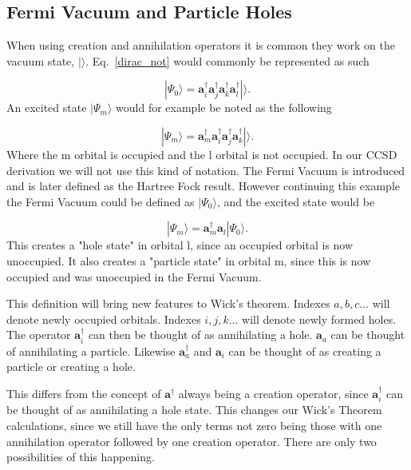 \documentclass[graybox,sectrefs,envcountresetchap,open=right]{svmonodo}
\begin{document}
\subsection{Fermi Vacuum and Particle Holes}

When using creation and annihilation operators it is common they work on the vacuum state, $| \rangle$. Eq.~\ref{dirac_not} would commonly be represented as such

\begin{equation}
|\Psi_0 \rangle = \mathbf{a}^{\dagger}_i
\mathbf{a}^{\dagger}_j
\mathbf{a}^{\dagger}_k
\mathbf{a}^{\dagger}_l |\rangle .
\end{equation} 
An excited state $|\Psi_m\rangle$ would for example be noted as the following

\begin{equation}
|\Psi_m \rangle = \mathbf{a}^{\dagger}_m
\mathbf{a}^{\dagger}_i
\mathbf{a}^{\dagger}_j
\mathbf{a}^{\dagger}_k |\rangle .
\end{equation} 
Where the m orbital is occupied and the l orbital is not occupied. In our CCSD derivation we will not use this kind of notation. The Fermi Vacuum is introduced and is later defined as the Hartree Fock result. However continuing this example the Fermi Vacuum could be defined as $|\Psi_0\rangle$, and the excited state would be

\begin{equation}
|\Psi_m\rangle = \mathbf{a}^{\dagger}_m \mathbf{a}_l |\Psi_0\rangle .
\end{equation} 
This creates a "hole state" in orbital l, since an occupied orbital is now unoccupied. It also creates a "particle state" in orbital m, since this is now occupied and was unoccupied in the Fermi Vacuum. 

This definition will bring new features to Wick's theorem. Indexes $a, b, c \dots$ will denote newly occupied orbitals. Indexes $i, j, k \dots$ will denote newly formed holes. The operator $\mathbf{a}^{\dagger}_i$ can then be thought of as annihilating a hole. $\mathbf{a}_a$ can be thought of annihilating a particle. Likewise $\mathbf{a}^{\dagger}_a$ and $\mathbf{a}_i$ can be thought of as creating a particle or creating a hole. 

This differs from the concept of $\mathbf{a}^{\dagger}$ always being a creation operator, since $\mathbf{a}^{\dagger}_i$ can be thought of as annihilating a hole state. This changes our Wick's Theorem calculations, since we still have the only terms not zero being those with one annihilation operator followed by one creation operator. There are only two possibilities of this happening.
\end{document}
